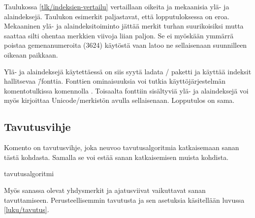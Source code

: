 
Taulukossa \ref{tlk/indeksien-vertailu} vertaillaan oikeita ja
mekaanisia ylä- ja alaindeksejä. Taulukon esimerkit paljastavat, että
lopputuloksessa on eroa. Mekaaninen ylä- ja alaindeksitoiminto jättää
merkit turhan suurikoisiksi mutta saattaa silti ohentaa merkkien viivoja
liian paljon. Se ei myöskään ymmärrä poistaa gemenanumeroita (3624)
käytöstä vaan latoo ne sellaisenaan suunnilleen oikeaan paikkaan.

Ylä- ja alaindeksejä käytettäessä on siis syytä ladata
\-/ paketti ja käyttää indeksit hallitsevaa
 \=/fonttia. Fonttien ominaisuuksia voi tutkia
käyttöjärjestelmän komentotulkissa komennolla . Toisaalta
fonttiin sisältyviä ylä- ja alaindeksejä voi myös kirjoittaa
Unicode\-/merkistön avulla sellaisenaan. Lopputulos on sama.

\subsection{Tavutusvihje}

Komento \komentom{-} on tavutusvihje, joka neuvoo tavutusalgoritmia
katkaisemaan sanan tästä kohdasta. Samalla se voi estää sanan
katkaisemisen muista kohdista.

\begin{koodilohkosis}
tavutus\-algo\-ritmi
\end{koodilohkosis}

\noindent
Myös sanassa olevat yhdysmerkit ja ajatusviivat vaikuttavat sanan
tavuttamiseen. Perusteellisemmin tavutusta ja sen asetuksia käsitellään
luvussa \ref{luku/tavutus}.


